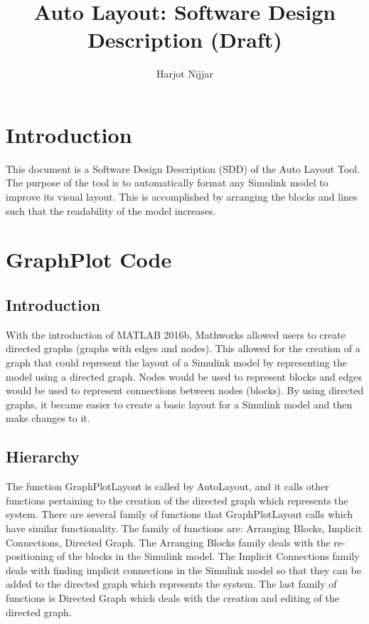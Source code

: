 \documentclass[12pt,letterpaper]{report}
\begin{document}
  
  \title{Auto Layout: Software Design Description (Draft)}
  
  \author{
    Harjot Nijjar\\
  }
  
  \maketitle
  
  \tableofcontents

\chapter{Introduction}

\par This document is a Software Design Description (SDD) of the Auto Layout Tool. The purpose of the tool is to automatically format any Simulink model to improve its visual layout. This is accomplished by arranging the blocks and lines such that the readability of the model increases.

\chapter{GraphPlot Code} \label{GraphPlotLabel}

\section{Introduction}
\par With the introduction of MATLAB 2016b, Mathworks allowed users to create directed graphs (graphs with edges and nodes). This allowed for the creation of a graph that could represent the layout of a Simulink model by representing the model using a directed graph. Nodes would be used to represent blocks and edges would be used to represent connections between nodes (blocks). By using directed graphs, it became easier to create a basic layout for a Simulink model and then make changes to it.

\section{Hierarchy}
\par The function GraphPlotLayout is called by AutoLayout, and it calls other functions pertaining to the creation of the directed graph which represents the system. There are several family of functions that GraphPlotLayout calls which have similar functionality. The family of functions are: Arranging  Blocks, Implicit Connections, Directed Graph. The Arranging Blocks family deals with the re-positioning of the blocks in the Simulink model. The Implicit Connections family deals with finding implicit connections in the Simulink model so that they can be added to the directed graph which represents the system. The last family of functions is Directed Graph which deals with the creation and editing of the directed graph.
\end{document}
